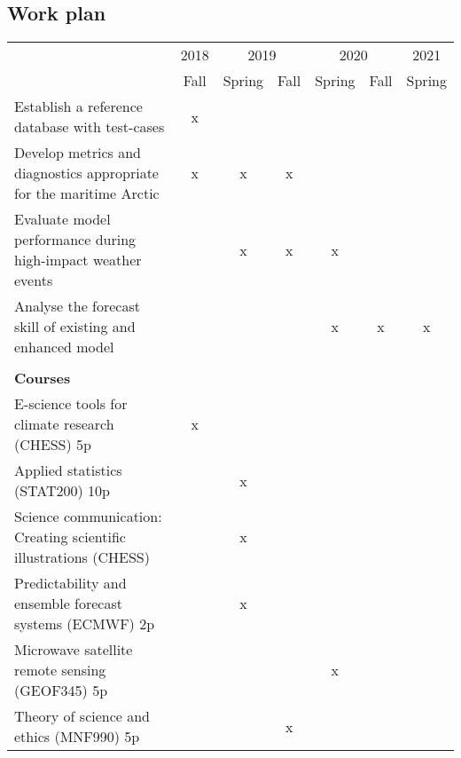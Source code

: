 \documentclass[a4paper,10pt]{article}
\begin{document}
\subsection{Work plan}
 \begin{tabular}{ p{5cm}  c  c  c  c  c  c } 
                                                                                      & 2018 & \multicolumn{2}{c}{2019} & \multicolumn{2}{c}{2020} & 2021\\
 
                                                                                      & Fall & Spring & Fall & Spring & Fall & Spring\\ [0.5ex] 
 \hline
 \hline
 Establish a reference database with test-cases                            & x    &          &       &          &      &\\ [0.5ex]
 \hline
Develop metrics and diagnostics appropriate for the maritime Arctic & x    & x       & x     &          &      &\\[0.5ex]
 \hline
Evaluate model performance during high-impact weather events      &       & x       & x     & x       &      &\\[0.5ex]
 \hline
Analyse the forecast skill of existing and enhanced model              &        &         &       & x       & x    & x\\
 \hline \\ [0.5ex]
\textbf{Courses}                                                                 &       &          &       &         &       &\\ %
 \hline
 \hline
E-science tools for climate research (CHESS) 5p                         & x     &          &       &         &       &\\ [0.5ex]%
 \hline
Applied statistics (STAT200) 10p                                            &      & x         &       &         &       &\\ [0.5ex]%
  \hline
 Science communication: Creating scientific illustrations (CHESS)    &      & x         &       &         &       &\\ [0.5ex]%
 \hline
 Predictability and ensemble forecast systems (ECMWF) 2p           &       & x         &      &         &       &\\[0.5ex]%
 \hline
 Microwave satellite remote sensing (GEOF345) 5p                      &       &            &      & x      &       &\\[0.5ex] %
 \hline
 Theory of science and ethics (MNF990) 5p                               &       &            & x    &        &       &\\ [0.5ex]%
 \hline
 \end{tabular}
\end{document}
